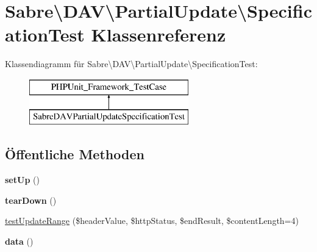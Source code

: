 \hypertarget{class_sabre_1_1_d_a_v_1_1_partial_update_1_1_specification_test}{}\section{Sabre\textbackslash{}D\+AV\textbackslash{}Partial\+Update\textbackslash{}Specification\+Test Klassenreferenz}
\label{class_sabre_1_1_d_a_v_1_1_partial_update_1_1_specification_test}
Klassendiagramm für Sabre\textbackslash{}D\+AV\textbackslash{}Partial\+Update\textbackslash{}Specification\+Test\+:\begin{figure}[H]
\begin{center}
\leavevmode
\includegraphics[height=2.000000cm]{class_sabre_1_1_d_a_v_1_1_partial_update_1_1_specification_test}
\end{center}
\end{figure}
\subsection*{Öffentliche Methoden}
\begin{DoxyCompactItemize}
\item 
\mbox{\label{class_sabre_1_1_d_a_v_1_1_partial_update_1_1_specification_test_a5454051a385cc6187f09aafb8330ca5a}} 
{\bfseries set\+Up} ()
\item 
\mbox{\label{class_sabre_1_1_d_a_v_1_1_partial_update_1_1_specification_test_a83f2b5b3c59c05e04953a32211ad2310}} 
{\bfseries tear\+Down} ()
\item 
\mbox{\hyperlink{class_sabre_1_1_d_a_v_1_1_partial_update_1_1_specification_test_a9390c4197dd217ff2e9883b4228008af}{test\+Update\+Range}} (\$header\+Value, \$http\+Status, \$end\+Result, \$content\+Length=4)
\item 
\mbox{\label{class_sabre_1_1_d_a_v_1_1_partial_update_1_1_specification_test_a78d90c2df67b623fe4de1de7b788c0d4}} 
{\bfseries data} ()
\end{DoxyCompactItemize}
